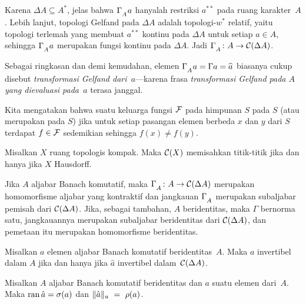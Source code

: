 Karena $\Delta A \subseteq A^*$, jelas bahwa $\Gamma_{{}_{\scriptstyle{A}}} a$ hanyalah restriksi $a^{**}$
pada ruang karakter~$A$. Lebih lanjut, topologi Gelfand pada $\Delta A$ adalah topologi-$w^*$ relatif,
yaitu topologi terlemah yang membuat $a^{**}$ kontinu pada $\Delta A$ untuk setiap $a \in A$,
sehingga $\Gamma_{{}_{\scriptstyle{A}}} a$ merupakan fungsi kontinu pada $\Delta A$. Jadi
$\Gamma_{{}_{\scriptstyle{A}}} \colon A \rightarrow \mathcal{C}(\Delta A)$.

Sebagai ringkasan dan demi kemudahan, elemen $\Gamma_{{}_{\scriptstyle{A}}} a = \Gamma a = \widehat{a}$ biasanya cukup
disebut
\emph{transformasi Gelfand dari~$a$}---karena frasa \emph{transformasi Gelfand pada $A$ yang dievaluasi
pada~$a$} terasa janggal.

\begin{defn} Kita mengatakan bahwa suatu keluarga fungsi $\mathcal{F}$ pada himpunan $S$
 pada $S$ (atau merupakan
 pada $S$) jika untuk setiap pasangan elemen berbeda $x$
dan $y$ dari $S$ terdapat $f \in \mathcal{F}$ sedemikian sehingga $f(x) \ne f(y)$.
\end{defn}

\begin{prop} Misalkan $X$ ruang topologis kompak. Maka $\mathcal{C}(X)$ memisahkan titik-titik jika dan
hanya jika $X$ Hausdorff.
\end{prop}

\begin{prop}\label{0007402} Jika $A$ aljabar Banach komutatif, maka $\Gamma_{{}_{\scriptstyle{A}}}
\colon A \rightarrow \mathcal{C}(\Delta A)$ merupakan homomorfisme aljabar yang kontraktif dan jangkauan
$\Gamma_{{}_{\scriptstyle{A}}}$ merupakan subaljabar pemisah dari $\mathcal{C}(\Delta A)$. Jika, sebagai tambahan,
$A$ beridentitas, maka $\Gamma$ bernorma satu, jangkauannya merupakan subaljabar beridentitas dari
$\mathcal{C}(\Delta A)$, dan pemetaan itu merupakan homomorfisme beridentitas.
\end{prop}

\begin{prop} Misalkan $a$ elemen aljabar Banach komutatif beridentitas~$A$. Maka $a$ invertibel dalam
$A$ jika dan hanya jika $\hat a$ invertibel dalam~$\mathcal{C}(\Delta A)$.
\end{prop}

\begin{prop}\label{00074043} Misalkan $A$ aljabar Banach komutatif beridentitas dan $a$ suatu
elemen dari~$A$. Maka $\operatorname{ran}\hat a = \sigma(a)$ dan $\lVert\hat a\rVert_u~=~\rho(a)$.
\end{prop}

